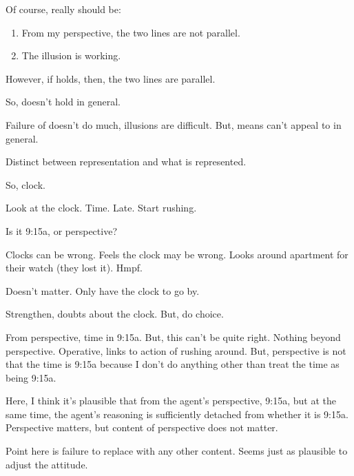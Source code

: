 \begin{note}
  Of course, really should be:

  \begin{enumerate}
  \item
    From my perspective, the two lines are not parallel.
  \item
    The illusion is working.
  \end{enumerate}

  However, if \ptivity{} holds, then, the two lines are parallel.
\end{note}


\begin{note}
  So, doesn't hold in general.
\end{note}

\begin{note}
  Failure of \ptivity{} doesn't do much, illusions are difficult.
  But, means can't appeal to \ptivity{} in general.
\end{note}

\begin{note}
  Distinct between representation and what is represented.

  So, clock.

  Look at the clock.
  Time.
  Late.
  Start rushing.

  Is it 9:15a, or perspective?

  Clocks can be wrong.
  Feels the clock may be wrong.
  Looks around apartment for their watch (they lost it).
  Hmpf.

  Doesn't matter.
  Only have the clock to go by.

  Strengthen, doubts about the clock.
  But, do choice.

  From perspective, time in 9:15a.
  But, this can't be quite right.
  Nothing beyond perspective.
  Operative, links to action of rushing around.
  But, perspective is not that the time is 9:15a because I don't do anything other than treat the time as being 9:15a.

  Here, I think it's plausible that from the agent's perspective, 9:15a, but at the same time, the agent's reasoning is sufficiently detached from whether it is 9:15a.
  Perspective matters, but content of perspective does not matter.
\end{note}

\begin{note}
  Point here is failure to replace with any other content.
  Seems just as plausible to adjust the attitude.
\end{note}

